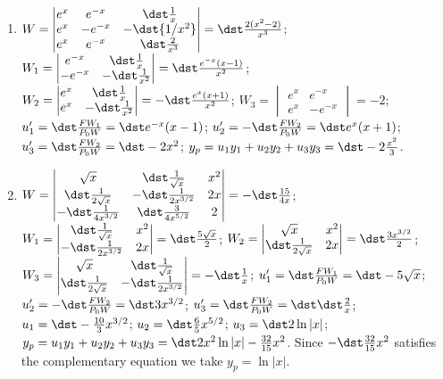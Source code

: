 \documentclass[openany]{book}
\newenvironment{sectionSolutions}{
 \begin{enumerate}[item-label={\thesection.\arabic{enumi}.}]
}{
 \end{enumerate}
}
\begin{document}
\begin{sectionSolutions}
\item
$W=\begin{vmatrix}
e^x&e^{-x}&\dst\frac{1}{ x}\\
e^x&-e^{-x}&-\dst{1/x^2}\\e^x&e^{-x}&\dst\frac{2}{ x^3}
\end{vmatrix}=\dst\frac{2(x^2-2)}{ x^3}$;
$W_1=\begin{vmatrix}
e^{-x}&\dst\frac{1}{ x}\\-e^{-x}&-\dst\frac{1}{ x^2}
\end{vmatrix}=\dst\frac{e^{-x}(x-1)}{ x^2}$;
$W_2=\begin{vmatrix}
e^x&\dst\frac{1}{ x}\\e^x&-\dst\frac{1}{ x^2}
\end{vmatrix}=-\dst\frac{e^x(x+1)}{ x^2}$;
$W_3=\begin{vmatrix}
e^x&e^{-x}\\e^x&-e^{-x}
\end{vmatrix}=-2$;
$u_1'=\dst\frac{FW_1}{ P_0W}=\dst e^{-x}(x-1)$;
$u_2'=-\dst\frac{FW_2}{ P_0W}=\dst e^x(x+1)$;
$u_3'=\dst\frac{FW_2}{ P_0W}=\dst -2x^2$;
$y_p=u_1y_1+u_2y_2+u_3y_3=\dst-2\frac{x^2}{3}$.



\item
$W=\begin{vmatrix}
\sqrt{x}&\dst\frac{1}{ \sqrt{x}}&x^2\\
\dst\frac{1}{ 2\sqrt{x}}&-\dst\frac{1}{ 2x^{3/2}}&2x\\
-\dst\frac{1}{ 4x^{3/2}}&\dst\frac{3}{ 4x^{5/2}}&2
\end{vmatrix}=-\dst\frac{15}{ 4x}$;
$W_1=\begin{vmatrix}
\dst\frac{1}{ \sqrt{x}}&x^2\\
-\dst\frac{1}{ 2x^{3/2}}&2x
\end{vmatrix}=\dst\frac{5\sqrt{x}}{ 2}$;
$W_2=\begin{vmatrix}
\sqrt{x}&x^2\\
\dst\frac{1}{ 2\sqrt{x}}&2x
\end{vmatrix}=\dst\frac{3x^{3/2}}{ 2}$;
$W_3=\begin{vmatrix}
\sqrt{x}&\dst\frac{1}{ \sqrt{x}}\\
\dst\frac{1}{ 2\sqrt{x}}&-\dst\frac{1}{ 2x^{3/2}}
\end{vmatrix}=-\dst\frac{1}{ x}$;
$u_1'=\dst\frac{FW_1}{ P_0W}=\dst-5\sqrt{x}$;
$u_2'=-\dst\frac{FW_2}{ P_0W}=\dst3x^{3/2}$;
$u_3'=\dst\frac{FW_2}{ P_0W}=\dst\dst\frac{2}{ x}$;
$u_1=\dst-\frac{10}{3}x^{3/2}$;
$u_2=\dst\frac{6}{5}x^{5/2}$;
$u_3=\dst2\ln|x|$;
$y_p=u_1y_1+u_2y_2+u_3y_3=\dst2x^2\ln|x|-\frac{32}{15}x^2$.
Since $-\dst\frac{32}{15}x^2$ satisfies the complementary equation
we take $y_p=\ln|x|$.





\end{sectionSolutions}
\end{document}

